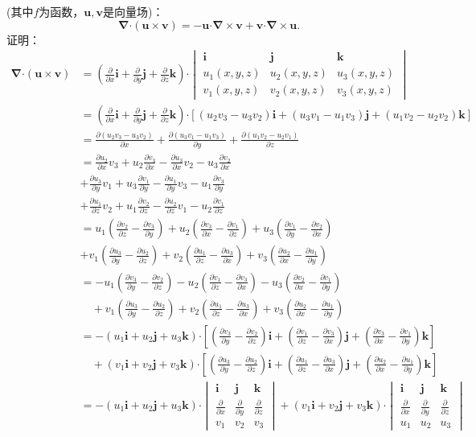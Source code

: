 \documentclass[12pt,UTF8,fleqn]{ctexart}
\newcommand{\pp}[2]{\frac{\partial #1}{\partial #2}}
\begin{document}
\begin{enumerate}
(其中$f$为函数，$\bm u,\bm v$是向量场)：
\[\bm\nabla\bm\cdot(\bm u\times\bm v)=-\bm u\bm\cdot\bm\nabla\times\bm v+\bm v\bm\cdot\bm\nabla\times\bm u.\]
证明：\[\begin{split}
\bm\nabla\bm\cdot(\bm u\times\bm v)&=(\pp{}x\bm i+\pp{}y\bm j+\pp{}z\bm k)\bm\cdot\begin{vmatrix}
\bm i&\bm j&\bm k\\
u_1(x,y,z)&u_2(x,y,z)&u_3(x,y,z)\\
v_1(x,y,z)&v_2(x,y,z)&v_3(x,y,z)
\end{vmatrix}\\
&=(\pp{}x\bm i+\pp{}y\bm j+\pp{}z\bm k)\bm\cdot[(u_2v_3-u_3v_2)\bm i+(u_3v_1-u_1v_3)\bm j+(u_1v_2-u_2v_2)\bm k]\\
&=\pp{(u_2v_3-u_3v_2)}x+\pp{(u_3v_1-u_1v_3)}y+\pp{(u_1v_2-u_2v_1)}z\\
&=\pp{u_2}xv_3+u_2\pp{v_3}x-\pp{u_3}xv_2-u_3\pp{v_2}x\\
&+\pp{u_3}yv_1+u_3\pp{v_1}y-\pp{u_1}yv_3-u_1\pp{v_3}y\\
&+\pp{u_1}zv_2+u_1\pp{v_2}z-\pp{u_2}zv_1-u_2\pp{v_1}z\\
&=u_1(\pp{v_2}z-\pp{v_3}y)+u_2(\pp{v_3}x-\pp{v_1}z)+u_3(\pp{v_1}y-\pp{v_2}x)\\
&+v_1(\pp{u_3}y-\pp{u_2}z)+v_2(\pp{u_1}z-\pp{u_3}x)+v_3(\pp{u_2}x-\pp{u_1}y)\\
&=-u_1(\pp{v_3}y-\pp{v_2}z)-u_2(\pp{v_1}z-\pp{v_3}x)-u_3(\pp{v_2}x-\pp{v_1}y)\\
&\quad+v_1(\pp{u_3}y-\pp{u_2}z)+v_2(\pp{u_1}z-\pp{u_3}x)+v_3(\pp{u_2}x-\pp{u_1}y)\\
&=-(u_1\bm i+u_2\bm j+u_3\bm k)\bm\cdot[(\pp{v_3}y-\pp{v_2}z)\bm i+(\pp{v_1}z-\pp{v_3}x)\bm j+(\pp{v_3}x-\pp{v_1}y)\bm k]\\
&\quad+(v_1\bm i+v_2\bm j+v_3\bm k)\bm\cdot[(\pp{u_3}y-\pp{u_2}z)\bm i+(\pp{u_1}z-\pp{u_3}x)\bm j+(\pp{u_2}x-\pp{u_1}y)\bm k]\\
&=-(u_1\bm i+u_2\bm j+u_3\bm k)\bm\cdot\begin{vmatrix}
\bm i&\bm j&\bm k\\
\pp{}x&\pp{}y&\pp{}z\\
v_1&v_2&v_3
\end{vmatrix}+(v_1\bm i+v_2\bm j+v_3\bm k)\bm\cdot\begin{vmatrix}
\bm i&\bm j&\bm k\\
\pp{}x&\pp{}y&\pp{}z\\
u_1&u_2&u_3
\end{vmatrix}\\

\end{split}\]
\end{enumerate}
\end{document}
